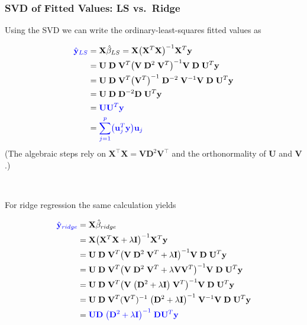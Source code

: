 \documentclass[
]{book}
\begin{document}
\subsubsection*{SVD of Fitted Values: LS vs.~Ridge}\label{svd-of-fitted-values-ls-vs.-ridge}

Using the SVD we can write the ordinary-least-squares fitted values as

\begin{align*}
{\color{blue}{\hat{\mathbf{y}}_{LS}}} &= \mathbf{X} \hat{\beta}_{LS}= \mathbf{X} \bigl(\mathbf{X}^T \mathbf{X} \bigr)^{-1} \mathbf{X}^T \mathbf{y}\\
&= \mathbf{U} \; \mathbf{D}\; \mathbf{V}^T \bigl(\mathbf{V}\; \mathbf{D}^2\; \mathbf{V}^T\bigr)^{-1} \mathbf{V}\; \mathbf{D}\;\mathbf{U}^T \mathbf{y}\\
&= \mathbf{U} \; \mathbf{D}\; \mathbf{V}^T \bigl( \mathbf{V}^T \bigl)^{-1}\; \mathbf{D}^{-2}\; \mathbf{V}^{-1} \mathbf{V}\; \mathbf{D}\;\mathbf{U}^T \mathbf{y}\\
&= \mathbf{U} \; \mathbf{D}\; \mathbf{D}^{-2}\mathbf{D}\;\mathbf{U}^T \mathbf{y}\\
&= {\color{blue}{\mathbf{U} \mathbf{U}^T \mathbf{y}}}\\
&= {\color{blue}{\sum_{j=1}^{p} \bigl(\mathbf{u}_j^T \mathbf{y} \bigr) \mathbf{u}_{j}}}
\end{align*}
(The algebraic steps rely on \(\mathbf{X}^\top\mathbf{X}=\mathbf{V}\mathbf{D}^2\mathbf{V}^\top\) and the orthonormality of \(\mathbf{U}\) and \(\mathbf{V}\).)

~

For ridge regression the same calculation yields

\begin{align*}
{\color{blue}{\hat{\mathbf{y}}_{ridge}}} &= \mathbf{X} \hat{\beta}_{ridge}\\
&= \mathbf{X} \bigl(\mathbf{X}^T \mathbf{X} + \lambda \mathbf{I} \bigr)^{-1} \mathbf{X}^T \mathbf{y}\\
&= \mathbf{U}\;\mathbf{D}\;\mathbf{V}^T \bigl(  \mathbf{V}\; \mathbf{D}^2\; \mathbf{V}^T + \lambda \mathbf{I} \bigr)^{-1}\mathbf{V}\;\mathbf{D}\;\mathbf{U}^T  \mathbf{y}\\
&= \mathbf{U}\;\mathbf{D}\;\mathbf{V}^T \bigl(  \mathbf{V}\; \mathbf{D}^2\; \mathbf{V}^T + \lambda \mathbf{V}\mathbf{V}^T \bigr)^{-1}\mathbf{V}\;\mathbf{D}\;\mathbf{U}^T  \mathbf{y}\\
&= \mathbf{U}\;\mathbf{D}\;\mathbf{V}^T \bigl(  \mathbf{V}\; \bigl( \mathbf{D}^2 + \lambda \mathbf{I} \bigr)\;  \mathbf{V}^T \bigr)^{-1}\mathbf{V}\;\mathbf{D}\;\mathbf{U}^T  \mathbf{y}\\
&= \mathbf{U}\;\mathbf{D}\;\mathbf{V}^T (\mathbf{V}^T)^{-1}\; \bigl( \mathbf{D}^2 + \lambda \mathbf{I} \bigr)^{-1}\;  \mathbf{V}^{-1}\mathbf{V}\;\mathbf{D}\;\mathbf{U}^T  \mathbf{y}\\
&= {\color{blue}{\mathbf{U}\mathbf{D}\;\bigl( \mathbf{D}^2 + \lambda \mathbf{I} \bigr)^{-1}\; \mathbf{D}\mathbf{U}^T  \mathbf{y}}}
\end{align*}
\end{document}
